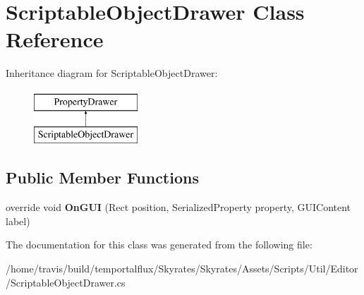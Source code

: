 \hypertarget{class_scriptable_object_drawer}{\section{Scriptable\-Object\-Drawer Class Reference}
\label{class_scriptable_object_drawer}
}
Inheritance diagram for Scriptable\-Object\-Drawer\-:\begin{figure}[H]
\begin{center}
\leavevmode
\includegraphics[height=2.000000cm]{class_scriptable_object_drawer}
\end{center}
\end{figure}
\subsection*{Public Member Functions}
\begin{DoxyCompactItemize}
\item 
\hypertarget{class_scriptable_object_drawer_a92ff00b532b034f39802d16790b41a16}{override void {\bfseries On\-G\-U\-I} (Rect position, Serialized\-Property property, G\-U\-I\-Content label)}\label{class_scriptable_object_drawer_a92ff00b532b034f39802d16790b41a16}

\end{DoxyCompactItemize}


The documentation for this class was generated from the following file\-:\begin{DoxyCompactItemize}
\item 
/home/travis/build/temportalflux/\-Skyrates/\-Skyrates/\-Assets/\-Scripts/\-Util/\-Editor/Scriptable\-Object\-Drawer.\-cs\end{DoxyCompactItemize}
